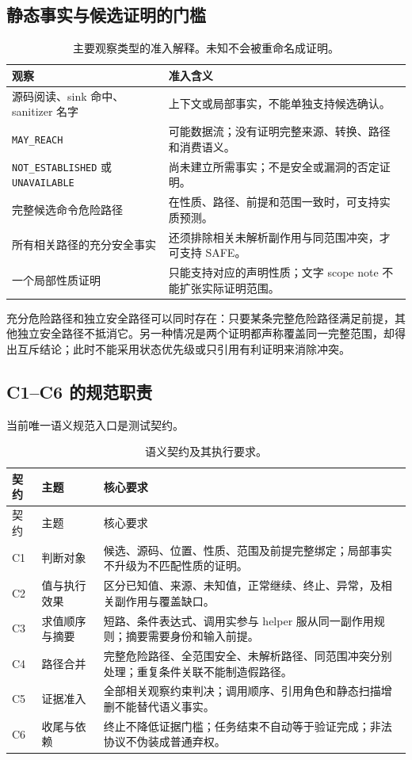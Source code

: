\documentclass[UTF8,a4paper,zihao=-4,fontset=none]{ctexart}
\newcommand{\code}[1]{{\small\nolinkurl{#1}}}
\begin{document}
\subsection{静态事实与候选证明的门槛}
\begin{table}[htbp]
\centering\small
\begin{tabularx}{\textwidth}{L{56mm}Y}
\toprule 观察 & 准入含义\\\midrule
源码阅读、sink 命中、sanitizer 名字 & 上下文或局部事实，不能单独支持候选确认。\\
\code{MAY_REACH} & 可能数据流；没有证明完整来源、转换、路径和消费语义。\\
\code{NOT_ESTABLISHED} 或 \code{UNAVAILABLE} & 尚未建立所需事实；不是安全或漏洞的否定证明。\\
完整候选命令危险路径 & 在性质、路径、前提和范围一致时，可支持实质预测。\\
所有相关路径的充分安全事实 & 还须排除相关未解析副作用与同范围冲突，才可支持 SAFE。\\
一个局部性质证明 & 只能支持对应的声明性质；文字 scope note 不能扩张实际证明范围。\\
\bottomrule
\end{tabularx}
\caption{主要观察类型的准入解释。未知不会被重命名成证明。}
\end{table}

充分危险路径和独立安全路径可以同时存在：只要某条完整危险路径满足前提，其他独立安全路径不抵消它。另一种情况是两个证明都声称覆盖同一完整范围，却得出互斥结论；此时不能采用状态优先级或只引用有利证明来消除冲突。

\subsection{C1--C6 的规范职责}
当前唯一语义规范入口是测试契约。\cite{contract}
\begin{longtable}{L{13mm}L{35mm}L{101mm}}
\caption{语义契约及其执行要求。}\\
\toprule 契约 & 主题 & 核心要求\\\midrule\endfirsthead
\toprule 契约 & 主题 & 核心要求\\\midrule\endhead
C1 & 判断对象 & 候选、源码、位置、性质、范围及前提完整绑定；局部事实不升级为不匹配性质的证明。\\
C2 & 值与执行效果 & 区分已知值、来源、未知值，正常继续、终止、异常，及相关副作用与覆盖缺口。\\
C3 & 求值顺序与摘要 & 短路、条件表达式、调用实参与 helper 服从同一副作用规则；摘要需要身份和输入前提。\\
C4 & 路径合并 & 完整危险路径、全范围安全、未解析路径、同范围冲突分别处理；重复条件关联不能制造假路径。\\
C5 & 证据准入 & 全部相关观察约束判决；调用顺序、引用角色和静态扫描增删不能替代语义事实。\\
C6 & 收尾与依赖 & 终止不降低证据门槛；任务结束不自动等于验证完成；非法协议不伪装成普通弃权。\\
\bottomrule
\end{longtable}
\end{document}
